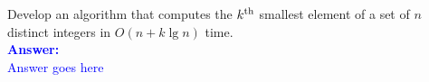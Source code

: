 \item{}
Develop an algorithm that computes the $k^{\rm th}$ smallest element of a set of
$n$ distinct integers in $O(n+k\lg n)$ time.\\[12pt]
\ifanswers
\textcolor{blue}{
\textbf{Answer:}\\[6pt]
Answer goes here
}
\newpage
\fi
